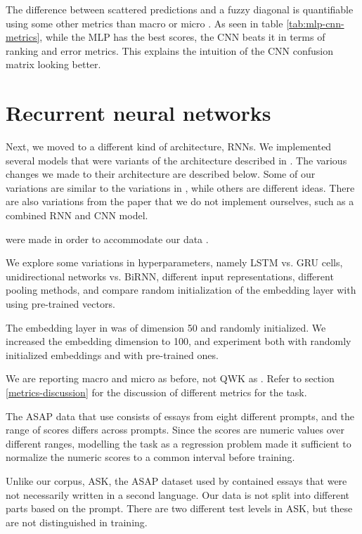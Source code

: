 The difference between scattered predictions and a fuzzy diagonal is
quantifiable using some other metrics than macro or micro \FI. As seen in
table \ref{tab:mlp-cnn-metrics}, while the \ac{MLP} has the best \FI scores,
the \ac{CNN} beats it in terms of ranking and error metrics. This explains
the intuition of the CNN confusion matrix looking better.


\section{Recurrent neural networks}

Next, we moved to a different kind of architecture, \acp{RNN}. We implemented
several models that were variants of the architecture described in
\textcite{taghipour16}. The various changes we made to their architecture
are described below. Some of our variations are similar to the variations
in \textcite{taghipour16}, while others are different ideas. There are also
variations from the paper that we do not implement ourselves, such as a
combined \ac{RNN} and \ac{CNN} model.

were made in order to accommodate our data . 

We explore some variations in hyperparameters, namely LSTM vs. GRU cells,
unidirectional networks vs. BiRNN, different input representations, different
pooling methods, and compare random initialization of the embedding layer
with using pre-trained vectors.

The embedding layer in \textcite{taghipour16} was of dimension 50 and
randomly initialized. We increased the embedding dimension to 100, and
experiment both with randomly initialized embeddings and with pre-trained
ones.

We are reporting macro and micro \FI as before, not QWK as
\citeauthor{taghipour16}. Refer to section \ref{metrics-discussion} for the
discussion of different metrics for the task.

The ASAP data that \citeauthor{taghipour16} use consists of essays from eight
different prompts, and the range of scores differs across prompts. Since the
scores are numeric values over different ranges, modelling the task as a
regression problem made it sufficient to normalize the numeric scores to a
common interval before training.

Unlike our corpus, ASK, the ASAP dataset used by \citeauthor{taghipour16}
contained essays that were not necessarily written in a second language. Our
data is not split into different parts based on the prompt. There are two
different test levels in ASK, but these are not distinguished in training.


